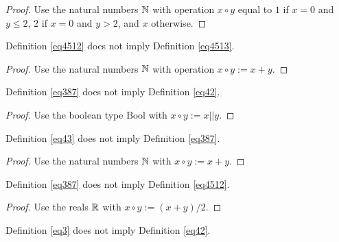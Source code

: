 \begin{proof}\leanok Use the natural numbers $\mathbb{N}$ with operation $x \circ y$ equal to $1$ if $x=0$ and $y \leq 2$, $2$ if $x=0$ and $y>2$, and $x$ otherwise.
\end{proof}

\begin{theorem}\label{4512_not_imply_4513}\leanok{} Definition \ref{eq4512} does not imply Definition \ref{eq4513}.
\end{theorem}

\begin{proof}\leanok Use the natural numbers $\mathbb{N}$ with operation $x \circ y := x + y$.
\end{proof}

\begin{theorem}\label{387_not_imply_42}\leanok{} Definition \ref{eq387} does not imply Definition \ref{eq42}.
\end{theorem}

\begin{proof}\leanok Use the boolean type $\mathrm{Bool}$ with $x \circ y := x || y$.
\end{proof}

\begin{theorem}\label{43_not_imply_387}\leanok{} Definition \ref{eq43} does not imply Definition \ref{eq387}.
\end{theorem}

\begin{proof}\leanok Use the natural numbers $\mathbb{N}$ with $x \circ y := x+y$.
\end{proof}

\begin{theorem}\label{387_not_imply_4512}\leanok{} Definition \ref{eq387} does not imply Definition \ref{eq4512}.
\end{theorem}

\begin{proof}\leanok Use the reals $\mathbb{R}$ with $x \circ y := (x+y)/2$.
\end{proof}

\begin{theorem}\label{3_not_imply_42}\leanok{} Definition \ref{eq3} does not imply Definition \ref{eq42}.
\end{theorem}

